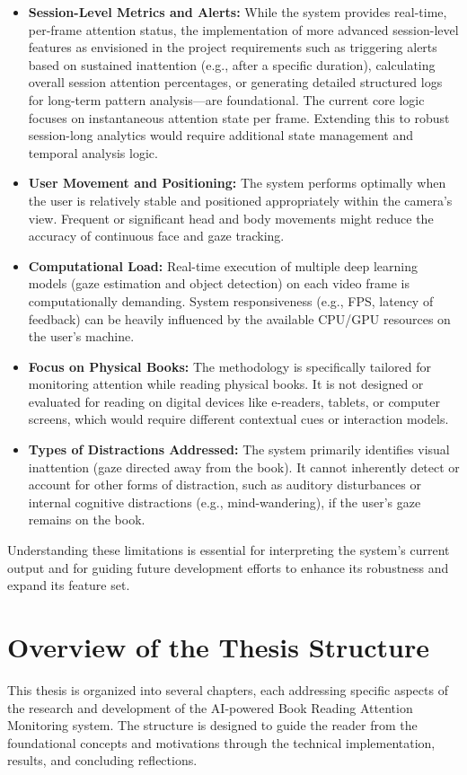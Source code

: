 \begin{itemize}
    \item \textbf{Session-Level Metrics and Alerts:} While the system provides real-time, per-frame attention status, the implementation of more advanced session-level features as envisioned in the project requirements such as triggering alerts based on sustained inattention (e.g., after a specific duration), calculating overall session attention percentages, or generating detailed structured logs for long-term pattern analysis—are foundational. The current core logic focuses on instantaneous attention state per frame. Extending this to robust session-long analytics would require additional state management and temporal analysis logic.
    
    \item \textbf{User Movement and Positioning:} The system performs optimally when the user is relatively stable and positioned appropriately within the camera's view. Frequent or significant head and body movements might reduce the accuracy of continuous face and gaze tracking.
    
    \item \textbf{Computational Load:} Real-time execution of multiple deep learning models (gaze estimation and object detection) on each video frame is computationally demanding. System responsiveness (e.g., FPS, latency of feedback) can be heavily influenced by the available CPU/GPU resources on the user's machine.
    
    \item \textbf{Focus on Physical Books:} The methodology is specifically tailored for monitoring attention while reading physical books. It is not designed or evaluated for reading on digital devices like e-readers, tablets, or computer screens, which would require different contextual cues or interaction models.
    
    \item \textbf{Types of Distractions Addressed:} The system primarily identifies visual inattention (gaze directed away from the book). It cannot inherently detect or account for other forms of distraction, such as auditory disturbances or internal cognitive distractions (e.g., mind-wandering), if the user's gaze remains on the book.
\end{itemize}
Understanding these limitations is essential for interpreting the system's current output and for guiding future development efforts to enhance its robustness and expand its feature set.

\section{Overview of the Thesis Structure}
This thesis is organized into several chapters, each addressing specific aspects of the research and development of the AI-powered Book Reading Attention Monitoring system. The structure is designed to guide the reader from the foundational concepts and motivations through the technical implementation, results, and concluding reflections.

